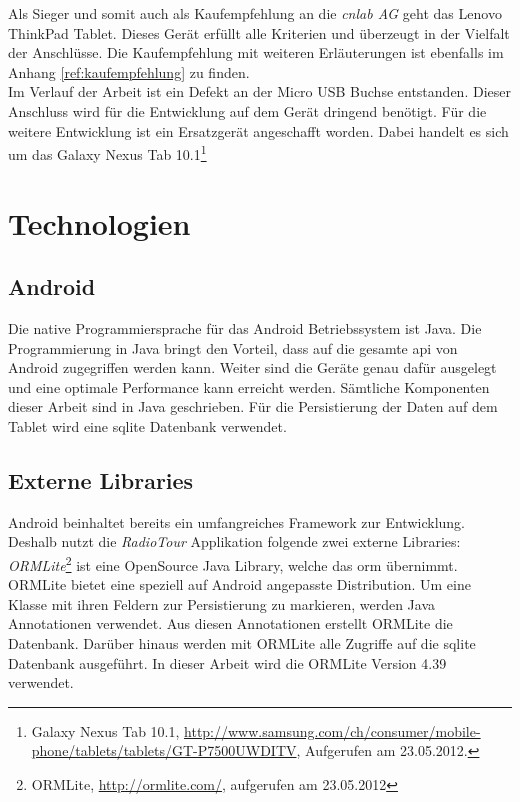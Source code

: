 Als Sieger und somit auch als Kaufempfehlung an die \textit{cnlab AG} geht das Lenovo ThinkPad Tablet. Dieses Gerät erfüllt alle Kriterien und überzeugt in der Vielfalt der Anschlüsse. Die Kaufempfehlung mit weiteren Erläuterungen ist ebenfalls im Anhang \ref{ref:kaufempfehlung} zu finden.
\\

Im Verlauf der Arbeit ist ein Defekt an der Micro USB Buchse entstanden. Dieser Anschluss wird für die Entwicklung auf dem Gerät dringend benötigt. Für die weitere Entwicklung ist ein Ersatzgerät angeschafft worden. Dabei handelt es sich um das Galaxy Nexus Tab 10.1\footnote{Galaxy Nexus Tab 10.1, \url{http://www.samsung.com/ch/consumer/mobile-phone/tablets/tablets/GT-P7500UWDITV}, Aufgerufen am 23.05.2012.}

\section{Technologien}
\subsection{Android}
Die native Programmiersprache für das Android Betriebssystem ist Java. Die Programmierung in Java bringt den Vorteil, dass auf die gesamte \gls{api} von Android zugegriffen werden kann. Weiter sind die Geräte genau dafür ausgelegt und eine optimale Performance kann erreicht werden. Sämtliche Komponenten dieser Arbeit sind in Java geschrieben. Für die Persistierung der Daten auf dem Tablet wird eine \gls{sqlite} Datenbank verwendet.

\subsection{Externe Libraries}
Android beinhaltet bereits ein umfangreiches Framework zur Entwicklung. Deshalb nutzt die \textit{RadioTour} Applikation folgende zwei externe Libraries:
\\

\textit{ORMLite}\footnote{ORMLite, \url{http://ormlite.com/}, aufgerufen am 23.05.2012} ist eine OpenSource Java Library, welche das \gls{orm} übernimmt. ORMLite bietet eine speziell auf Android angepasste Distribution. Um eine Klasse mit ihren Feldern zur Persistierung zu markieren, werden Java Annotationen verwendet. Aus diesen Annotationen erstellt ORMLite die Datenbank. Darüber hinaus werden mit ORMLite alle Zugriffe auf die \gls{sqlite} Datenbank ausgeführt. In dieser Arbeit wird die ORMLite Version 4.39 verwendet.
\\


